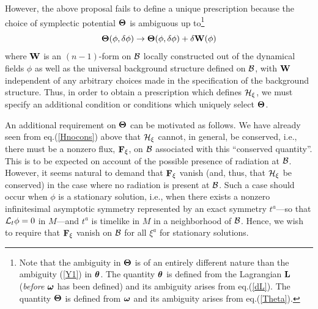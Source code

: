 However, the above proposal fails to define a unique prescription
because the choice of symplectic potential ${\mbox{\boldmath
$\Theta$}}$ is ambiguous up to\footnote{Note that the ambiguity in
${\mbox{\boldmath $\Theta$}}$ is of an entirely different nature than
the ambiguity (\ref{Y1}) in ${\mbox{\boldmath $\theta$}}$. The
quantity ${\mbox{\boldmath $\theta$}}$ is defined from the Lagrangian
${\bf L}$ ({\it before} ${\mbox{\boldmath $\omega$}}$ has been
defined) and its ambiguity arises from eq.(\ref{dL}). The quantity
${\mbox{\boldmath $\Theta$}}$ is defined from ${\mbox{\boldmath
$\omega$}}$ and its ambiguity arises from eq.(\ref{Theta}).}
\begin{equation}
{\mbox{\boldmath $\Theta$}}(\phi, \delta \phi) \rightarrow
{\mbox{\boldmath $\Theta$}}(\phi, \delta \phi) + \delta {\bf W}(\phi)
\label{W}
\end{equation}
where ${\bf W}$ is an $(n-1)$-form on ${\cal B}$ locally constructed
out of the dynamical fields $\phi$ as well as the universal background
structure defined on ${\cal B}$, with ${\bf W}$ independent of any
arbitrary choices made in the specification of the background
structure.  Thus, in order to obtain a prescription which defines
${\cal H}_\xi$, we must specify an additional condition or conditions
which uniquely select ${\mbox{\boldmath $\Theta$}}$.

An additional requirement on ${\mbox{\boldmath $\Theta$}}$ can be
motivated as follows. We have already seen from eq.(\ref{Hnocons})
above that ${\cal H}_\xi$ cannot, in general, be conserved, i.e.,
there must be a nonzero flux, ${\bf F}_\xi$, on ${\cal B}$ associated
with this ``conserved quantity''. This is to be expected on account of
the possible presence of radiation at ${\cal B}$. However, it seems
natural to demand that ${\bf F}_\xi$ vanish (and, thus, that ${\cal H}_\xi$
be conserved) in the case where no radiation is present at ${\cal
B}$. Such a case should occur when $\phi$ is a stationary solution,
i.e., when there exists a nonzero infinitesimal asymptotic symmetry
represented by an exact symmetry $t^a$---so that ${\cal L}_t \phi =
0$ in $M$---and $t^a$ is timelike in $M$ in a neighborhood of ${\cal
B}$. Hence, we wish to require that ${\bf F}_\xi$ vanish on ${\cal B}$
for all $\xi^a$ for stationary solutions. 

